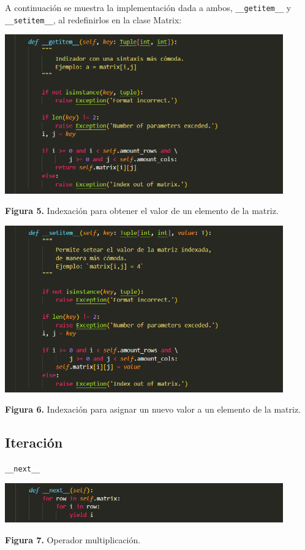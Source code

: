 \documentclass[10pt]{article} %
\newcommand{\imgcaption}[2]{\tiny \textbf{Figura #1.} #2.}
\newcommand{\mgc}[2][]{\colorbox{backcolour}{\texttt{\_\_#2\_\_#1}}}
\begin{document}
A continuaci\'on se muestra la implementaci\'on dada a ambos, 
\mgc{getitem} y \mgc{setitem}, al redefinirlos en la clase Matrix:

\begin{center}
	\includegraphics[width=12cm]{getitem.png}
	
	\imgcaption{5}{Indexaci\'on para obtener el valor de un elemento de la matriz}
\end{center}

\begin{center}
	\includegraphics[width=12cm]{setitem.png}
	
	\imgcaption{6}{Indexaci\'on para asignar un nuevo valor a un elemento de la matriz}
\end{center}

\subsection{Iteraci\'on}

\mgc{next}

\begin{center}
	\includegraphics[width=12cm]{next.png}
	
	\imgcaption{7}{Operador multiplicaci\'on}
\end{center}
\end{document}
